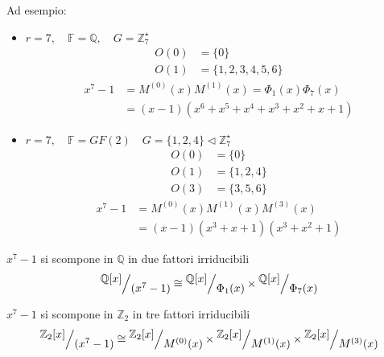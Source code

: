 \documentclass[mathserif]{beamer}
\def\quotient#1#2{%
   \raise1ex\hbox{$#1$}\Big/\lower1ex\hbox{$#2$}%
}
\begin{document}
\thispagestyle{empty}
\begin{frame}
   \vspace{-1.2cm}
   Ad esempio: 
   \begin{itemize}
      \item   $r = 7 , \quad \mathbb{F} = \mathbb{Q}, \quad G = \mathbb{Z}_{7}^{\star}$ 
	  \begin{align*}
	      O(0)&= \lbrace 0 \rbrace \\
	      O(1)&= \lbrace 1,2,3,4,5,6 \rbrace
	  \end{align*}
	    \begin{align*}
	      x^{7} - 1 &= M^{(0)}(x) M^{(1)}(x) =  \Phi_{1}(x) \Phi_{7}(x)  \\
			&= (x-1)(x^6 +x^5 + x^4 + x^3 +x^2 + x +1)
	    \end{align*}  
      \item  $r = 7 , \quad \mathbb{F} = GF(2)  \quad G =\lbrace 1,2,4 \rbrace \triangleleft \mathbb{Z}_{7}^{\star}$ 
	  \begin{align*}
	      O(0) &= \lbrace 0 \rbrace \\
	      O(1) &= \lbrace 1,2,4 \rbrace \\
	      O(3) &= \lbrace 3,5,6 \rbrace
	  \end{align*}   
	  \begin{align*}
	      x^{7} - 1 &= M^{(0)}(x) M^{(1)}(x) M^{(3)}(x) \\
			&= (x-1)(x^3 + x + 1)(x^3 + x^2 + 1) 
	    \end{align*}
   \end{itemize}
\end{frame}

\thispagestyle{empty}
\begin{frame}
   \vspace{-1.5cm}
        \begin{center}
         $x^7 - 1$ si scompone in $ \mathbb{Q} $ in due fattori irriducibili 
	\begin{align*}
	  \quotient{\mathbb{Q} \lbrack x \rbrack  }{(x^{7} - 1)}
	  \cong
	  \quotient{\mathbb{Q} \lbrack x \rbrack  }{\Phi_{1}(x)}
	  \times
	  \quotient{\mathbb{Q} \lbrack x \rbrack  }{\Phi_{7}(x)}
	\end{align*}
	\vspace{1cm}
	
	 $x^7 - 1$ si scompone in $ \mathbb{Z}_{2}$ in tre fattori irriducibili
	\begin{align*}
	  \quotient{\mathbb{Z}_{2} \lbrack x \rbrack  }{(x^{7} - 1)}
	  \cong
	  \quotient{\mathbb{Z}_{2} \lbrack x \rbrack  }{M^{(0)}(x)}
	  \times
	  \quotient{\mathbb{Z}_{2} \lbrack x \rbrack  }{M^{(1)}(x)}
	  \times
	  \quotient{\mathbb{Z}_{2} \lbrack x \rbrack  }{M^{(3)}(x)}
	\end{align*}
	\end{center}
\end{frame}
\end{document}

